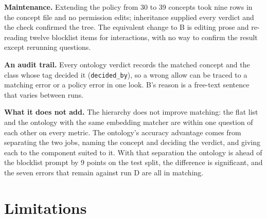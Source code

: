 \documentclass[conference]{IEEEtran}
\begin{document}
\textbf{Maintenance.} Extending the policy from 30 to 39 concepts took nine rows in the concept file and no permission edits; inheritance supplied every verdict and the check confirmed the tree. The equivalent change to B is editing prose and re-reading twelve blocklist items for interactions, with no way to confirm the result except rerunning questions.

\textbf{An audit trail.} Every ontology verdict records the matched concept and the class whose tag decided it (\texttt{decided\_by}), so a wrong allow can be traced to a matching error or a policy error in one look. B's reason is a free-text sentence that varies between runs.

\textbf{What it does not add.} The hierarchy does not improve matching: the flat list and the ontology with the same embedding matcher are within one question of each other on every metric. The ontology's accuracy advantage comes from separating the two jobs, naming the concept and deciding the verdict, and giving each to the component suited to it. With that separation the ontology is ahead of the blocklist prompt by 9 points on the test split, the difference is significant, and the seven errors that remain against run D are all in matching.

\section{Limitations}
\end{document}
